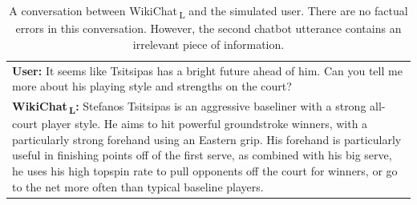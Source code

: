 \documentclass[11pt]{article}
\newcommand{\systeml}[0]{WikiChat$\,$\textsubscript{L}\xspace}
\begin{document}
\begin{table}
{\begin{tabular}{p{\linewidth}}
\textbf{User:} It seems like Tsitsipas has a bright future ahead of him. Can you tell me more about his playing style and strengths on the court?\\
\textbf{\systeml:} Stefanos Tsitsipas is an aggressive baseliner with a strong all-court player style. He aims to hit powerful groundstroke winners, with a particularly strong forehand using an Eastern grip. His forehand is particularly useful in finishing points off of the first serve, as combined with his big serve, he uses his high topspin rate to pull opponents off the court for winners, or go to the net more often than typical baseline players.
\end{tabular}
}
\caption{A conversation between \systeml and the simulated user. There are no factual errors in this conversation. However, the second chatbot utterance contains an irrelevant piece of information.}
\label{table:example-wikichat-llama}
\end{table}
\end{document}
